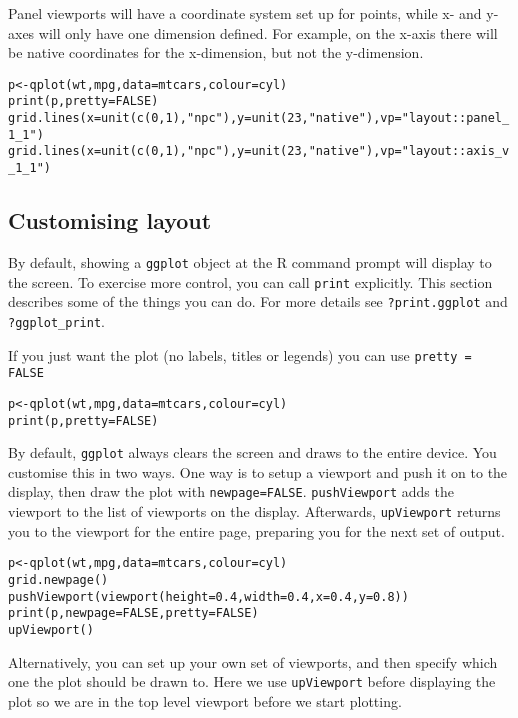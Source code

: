 Panel viewports will have a coordinate system set up for points, while x- and y- axes will only have one dimension defined.  For example, on the x-axis there will be native coordinates for the x-dimension, but not the y-dimension.

\begin{alltt}
p <- qplot(wt, mpg, data=mtcars, colour=cyl)
print(p, pretty=FALSE)
grid.lines(x=unit(c(0,1), "npc"), y=unit(23, "native"), vp="layout::panel_1_1")
grid.lines(x=unit(c(0,1), "npc"), y=unit(23, "native"), vp="layout::axis_v_1_1")
\end{alltt}



\subsection{Customising layout}\label{sec:controlling_output}

By default, showing a {\tt ggplot} object at the R command prompt will display to the screen.  To exercise more control, you can call {\tt print} explicitly.  This section describes some of the things you can do.  For more details see {\tt ?print.ggplot} and {\tt ?ggplot\_print}.

If you just want the plot (no labels, titles or legends) you can use {\tt pretty = FALSE}

\begin{alltt}
p <- qplot(wt, mpg, data=mtcars, colour=cyl)
print(p, pretty = FALSE)
\end{alltt}

By default, {\tt ggplot} always clears the screen and draws to the entire device.  You customise this in two ways. One way is to setup a viewport and push it on to the display, then draw the plot with {\tt newpage=FALSE}. {\tt pushViewport} adds the viewport to the list of viewports on the display.   Afterwards, {\tt upViewport} returns you to the viewport for the entire page, preparing you for the next set of output.

\begin{alltt}
p <- qplot(wt, mpg, data=mtcars, colour=cyl)
grid.newpage()
pushViewport(viewport(height=0.4, width=0.4, x=0.4, y=0.8))
print(p, newpage=FALSE, pretty=FALSE)
upViewport()
\end{alltt}

Alternatively, you can set up your own set of viewports, and then specify which one the plot should be drawn to.  Here we use {\tt upViewport} before displaying the plot so we are in the top level viewport before we start plotting.

